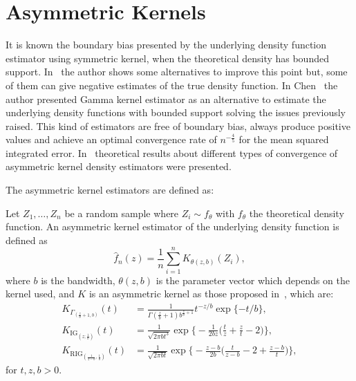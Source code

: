 \documentclass[journal]{IEEEtran}
\numberwithin{equation}{section}
\begin{document}

\section{Asymmetric Kernels}
\label{AK}

It is known the boundary bias presented by the underlying density function estimator using symmetric kernel, when the theoretical density has bounded support. In~\cite{Jones1993} the author shows some alternatives to improve this point but, some of them can give negative estimates of the true density function. In Chen~\cite{chensx2000} the author presented Gamma kernel estimator as an alternative to estimate the underlying density functions with bounded support solving the issues previously raised. This kind of estimators are free of boundary bias, always produce positive values and achieve an optimal convergence rate of $n^{-\frac{4}{5}}$ for the mean squared integrated error. In~\cite{bouezmarni2005} theoretical results about different types of convergence of asymmetric kernel density estimators were presented. 

The asymmetric kernel estimators are defined as:


Let $Z_1, \ldots, Z_n$ be a random sample where $Z_i \sim f_{\theta}$ with $f_{\theta}$ the theoretical density function. An asymmetric kernel estimator of the underlying density function is defined as 
\begin{equation}
\widehat{f}_n(z)=\frac{1}{n}\sum_{i=1}^n K_{\theta(z,b)}(Z_i),
\label{fn}
\end{equation}
where  $b$ is the bandwidth, ${\theta}(z,b)$ is the parameter vector which depends on the kernel used, and $K$ is an asymmetric kernel  as those proposed in~\cite{bouezmarni2005}, which are: 
\begin{align}
K_{\Gamma_{\left(\frac{z}{b}+1,b\right)}}(t) & =\frac{1}{\Gamma(\frac{z}{b}+1)b^{\frac{z}{b}+1}} t^{-{z}/{b}} \exp\{-{t}/{b}\},
\label{gammakernel}\\
K_{\text{IG}_{\left( z;\frac{1}{b}\right)}}(t) & =\frac{1}{\sqrt{2\pi b t^3}} 
\exp\Big\{-\frac{1}{2b z} \Big(\frac{t}{z}+\frac{z}{t}-2\Big)\Big\},
\label{IGkernel}\\
K_{\text{RIG}_{\left(\frac{1}{z-b},\frac{1}{b}\right)}}(t) & =\frac{1}{\sqrt{2\pi b t}} 
\exp\Big\{-\frac{z-b}{2b} \Big(\frac{t}{z-b}-2+\frac{z-b}{t}\Big)\Big\},
\label{RIGkernel}
\end{align}
for $t,z,b>0$.
\end{document}
